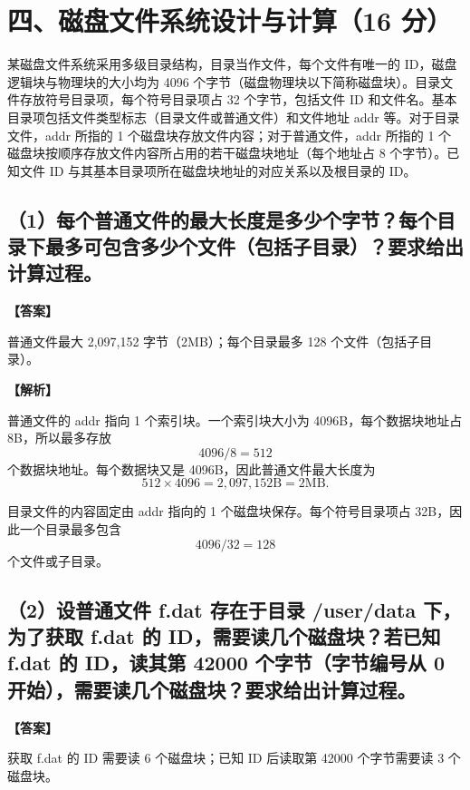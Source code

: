 \documentclass[UTF8,12pt]{ctexart}
\newenvironment{explanation}{\par\noindent\textbf{【解析】}\par\smallskip}{\par\medskip}
\newenvironment{answer}{\par\noindent\textbf{【答案】}\par\smallskip}{\par}
\begin{document}
\section*{四、磁盘文件系统设计与计算（16 分）}
某磁盘文件系统采用多级目录结构，目录当作文件，每个文件有唯一的 ID，磁盘逻辑块与物理块的大小均为 4096 个字节（磁盘物理块以下简称磁盘块）。目录文件存放符号目录项，每个符号目录项占 32 个字节，包括文件 ID 和文件名。基本目录项包括文件类型标志（目录文件或普通文件）和文件地址 addr 等。对于目录文件，addr 所指的 1 个磁盘块存放文件内容；对于普通文件，addr 所指的 1 个磁盘块按顺序存放文件内容所占用的若干磁盘块地址（每个地址占 8 个字节）。已知文件 ID 与其基本目录项所在磁盘块地址的对应关系以及根目录的 ID。

\subsection*{（1）每个普通文件的最大长度是多少个字节？每个目录下最多可包含多少个文件（包括子目录）？要求给出计算过程。}
\begin{answer}
普通文件最大 2,097,152 字节（2MB）；每个目录最多 128 个文件（包括子目录）。
\end{answer}

\begin{explanation}
普通文件的 addr 指向 1 个索引块。一个索引块大小为 4096B，每个数据块地址占 8B，所以最多存放
\[
4096/8=512
\]
个数据块地址。每个数据块又是 4096B，因此普通文件最大长度为
\[
512\times4096=2,097,152\text{B}=2\text{MB}.
\]

目录文件的内容固定由 addr 指向的 1 个磁盘块保存。每个符号目录项占 32B，因此一个目录最多包含
\[
4096/32=128
\]
个文件或子目录。
\end{explanation}
\subsection*{（2）设普通文件 f.dat 存在于目录 /user/data 下，为了获取 f.dat 的 ID，需要读几个磁盘块？若已知 f.dat 的 ID，读其第 42000 个字节（字节编号从 0 开始），需要读几个磁盘块？要求给出计算过程。}
\begin{answer}
获取 f.dat 的 ID 需要读 6 个磁盘块；已知 ID 后读取第 42000 个字节需要读 3 个磁盘块。
\end{answer}
\end{document}
